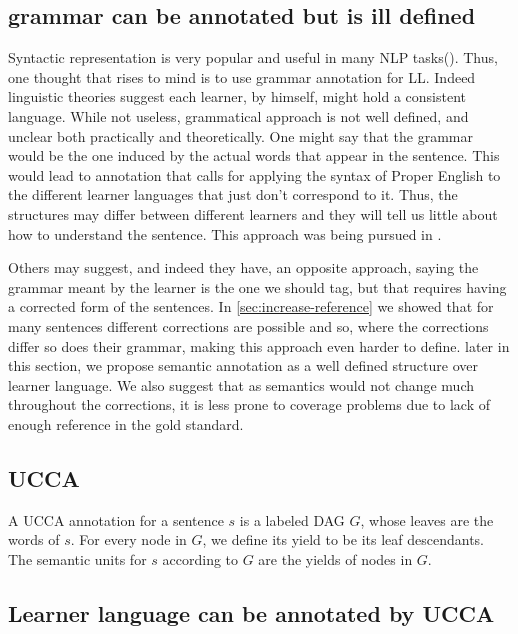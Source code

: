 \documentclass[english]{article}
\begin{document}
\subsection{grammar can be annotated but is ill defined}

Syntactic representation is very popular and useful in many NLP tasks(\cite{mesfar2007named,ng2002improving,zollmann2006syntax}).
Thus, one thought that rises to mind is to use grammar annotation
for LL. Indeed linguistic theories suggest each learner, by himself, might hold a consistent language\cite{huebner1985system,tarone1983variability}. While not useless, grammatical approach is not well
defined, and unclear both practically and theoretically. One might
say that the grammar would be the one induced by the actual words
that appear in the sentence. This would lead to annotation that calls
for applying the syntax of Proper English to the different learner
languages that just don't correspond to it. Thus, the structures may
differ between different learners and they will tell us little about
how to understand the sentence. This approach was being pursued in
\cite{berzak2016universal,ragheb2012defining}. 

Others may suggest, and indeed they have\cite{nagataphrase}, an opposite
approach, saying the grammar meant by the learner is the one we should
tag, but that requires having a corrected form of the sentences. In \ref{sec:increase-reference}
we showed that for many sentences different corrections are possible and so, where the corrections differ so does their grammar, making this approach even harder to define. later in this
section, we propose semantic annotation as a well defined structure over learner language. We also suggest that as semantics would not change much throughout the corrections, it is less prone to coverage problems due to lack of enough reference in the gold standard.

\subsection{UCCA}
A UCCA annotation for a sentence $s$ is a labeled DAG $G$, whose
leaves are the words of $s$. For every node in $G$,
we define its yield to be its leaf descendants. The
semantic units for $s$ according to $G$ are the yields
of nodes in $G$.

\subsection{Learner language can be annotated by UCCA}
\end{document}
